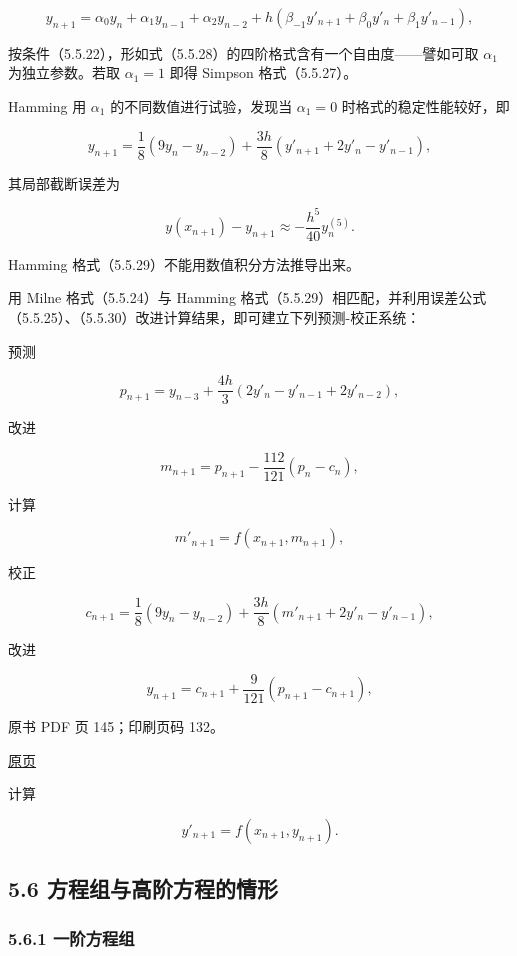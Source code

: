 \[
y_{n+1}=\alpha_0y_n+\alpha_1y_{n-1}+\alpha_2y_{n-2}+h(\beta_{-1}y'_{n+1}+\beta_0y'_n+\beta_1y'_{n-1}),
\tag{5.5.28}
\]

按条件（5.5.22），形如式（5.5.28）的四阶格式含有一个自由度------譬如可取 \(\alpha_1\) 为独立参数。若取 \(\alpha_1=1\) 即得 Simpson 格式（5.5.27）。

Hamming 用 \(\alpha_1\) 的不同数值进行试验，发现当 \(\alpha_1=0\) 时格式的稳定性能较好，即

\[
y_{n+1}=\frac18(9y_n-y_{n-2})+\frac{3h}{8}(y'_{n+1}+2y'_n-y'_{n-1}),
\tag{5.5.29}
\]

其局部截断误差为

\[
y(x_{n+1})-y_{n+1}\approx-\frac{h^5}{40}y_n^{(5)}.
\tag{5.5.30}
\]

Hamming 格式（5.5.29）不能用数值积分方法推导出来。

用 Milne 格式（5.5.24）与 Hamming 格式（5.5.29）相匹配，并利用误差公式（5.5.25）、（5.5.30）改进计算结果，即可建立下列预测-校正系统：

预测

\[
p_{n+1}=y_{n-3}+\frac{4h}{3}(2y'_n-y'_{n-1}+2y'_{n-2}),
\]

改进

\[
m_{n+1}=p_{n+1}-\frac{112}{121}(p_n-c_n),
\]

计算

\[
m'_{n+1}=f(x_{n+1},m_{n+1}),
\]

校正

\[
c_{n+1}=\frac18(9y_n-y_{n-2})+\frac{3h}{8}(m'_{n+1}+2y'_n-y'_{n-1}),
\]

改进

\[
y_{n+1}=c_{n+1}+\frac9{121}(p_{n+1}-c_{n+1}),
\]

\clearpage

原书 PDF 页 145；印刷页码 132。

\href{source-images/pdf-145.jpeg}{原页}

计算

\[
y'_{n+1}=f(x_{n+1},y_{n+1}).
\]

\subsection{5.6 方程组与高阶方程的情形}\label{ch05b-ux65b9ux7a0bux7ec4ux4e0eux9ad8ux9636ux65b9ux7a0bux7684ux60c5ux5f62}

\subsubsection{5.6.1 一阶方程组}\label{ch05b-ux4e00ux9636ux65b9ux7a0bux7ec4}

